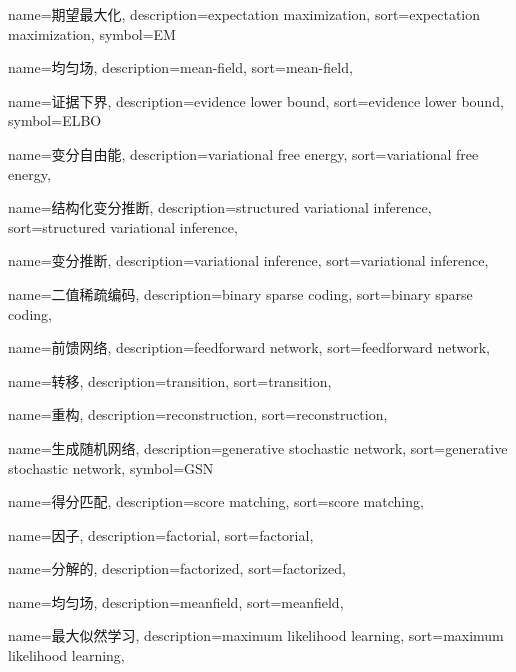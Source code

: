 {
  name=期望最大化,
  description={expectation maximization},
  sort={expectation maximization},
  symbol={EM}
}

{
  name=均匀场,
  description={mean-field},
  sort={mean-field},
}

{
  name=证据下界,
  description={evidence lower bound},
  sort={evidence lower bound},
  symbol={ELBO}
}

{
  name=变分自由能,
  description={variational free energy},
  sort={variational free energy},
}

{
  name=结构化变分推断,
  description={structured variational inference},
  sort={structured variational inference},
}

{
  name=变分推断,
  description={variational inference},
  sort={variational inference},
}

{
  name=二值稀疏编码,
  description={binary sparse coding},
  sort={binary sparse coding},
}

{
  name=前馈网络,
  description={feedforward network},
  sort={feedforward network},
}

{
  name=转移,
  description={transition},
  sort={transition},
}

{
  name=重构,
  description={reconstruction},
  sort={reconstruction},
}

{
  name=生成随机网络,
  description={generative stochastic network},
  sort={generative stochastic network},
  symbol={GSN}
}

{
  name=得分匹配,
  description={score matching},
  sort={score matching},
}

{
  name=因子,
  description={factorial},
  sort={factorial},
}

{
	name=分解的,
	description={factorized},
	sort={factorized},
}

{
  name=均匀场,
  description={meanfield},
  sort={meanfield},
}

{
  name=最大似然学习,
  description={maximum likelihood learning},
  sort={maximum likelihood learning},
}

